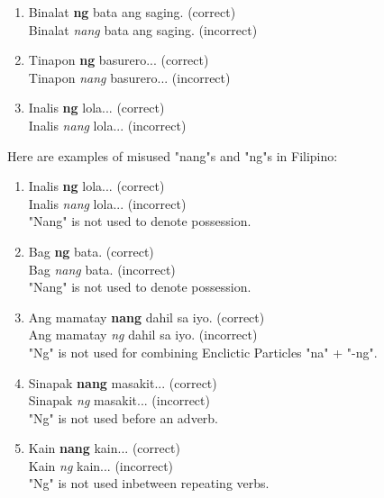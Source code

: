 \begin{enumerate}
      \item Binalat \textbf{ng} bata ang saging. (correct)
            \\ Binalat \textit{nang} bata ang saging. (incorrect)
      \item Tinapon \textbf{ng} basurero... (correct)
            \\ Tinapon \textit{nang} basurero... (incorrect)
      \item Inalis \textbf{ng} lola... (correct)
            \\ Inalis \textit{nang} lola... (incorrect)
\end{enumerate}

Here are examples of misused "nang"s and "ng"s in Filipino:

\begin{example}

\end{example}

\begin{enumerate}
      \item Inalis \textbf{ng} lola... (correct) \\
            Inalis \textit{nang} lola... (incorrect) \\
            "Nang" is not used to denote possession.
      \item Bag \textbf{ng} bata. (correct) \\
            Bag \textit{nang} bata. (incorrect) \\
            "Nang" is not used to denote possession.
      \item Ang mamatay \textbf{nang} dahil sa iyo. (correct) \\
            Ang mamatay \textit{ng} dahil sa iyo. (incorrect) \\
            "Ng" is not used for combining Enclictic Particles "na" + "-ng".
      \item Sinapak \textbf{nang} masakit... (correct) \\
            Sinapak \textit{ng} masakit... (incorrect) \\
            "Ng" is not used before an adverb.
      \item Kain \textbf{nang} kain... (correct) \\
            Kain \textit{ng} kain... (incorrect) \\
            "Ng" is not used inbetween repeating verbs.
\end{enumerate}

